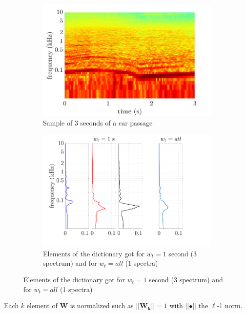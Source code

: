 \documentclass[twocolumn,a4paper,10pt]{article}
\begin{document}
\begin{figure}[t!]
    \centering
    \begin{subfigure}[t]{0.47\linewidth}
        \centering
       \includegraphics[width=\linewidth]{figures/dictionary1.pdf}
        \caption{Sample of 3 seconds of a car passage}
        \label{fig:specW}
    \end{subfigure}%
    \hfill
    \begin{subfigure}[t]{0.47\linewidth}
        \centering
       \includegraphics[width=\linewidth]{figures/dictionary2.pdf}
        \caption{Elements of the dictionary got for $w_t = 1$ second (3 spectrum) and  for $w_t = all$ (1 spectra) }
        \label{fig:ElementW}
    \end{subfigure}
\end{figure}


Each $k$ element of $\mathbf{W}$ is normalized such as $\vert \vert \mathbf{W_k} \vert \vert = 1$ with $\vert \vert \bullet \vert\vert$ the $\ell$-1 norm.\\
\end{document}
